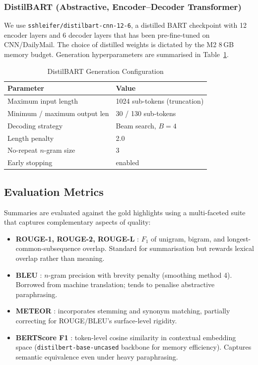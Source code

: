 \subsubsection{DistilBART (Abstractive, Encoder–Decoder Transformer)}

We use \texttt{sshleifer/distilbart-cnn-12-6}, a distilled BART
\cite{lewis2020bart} checkpoint with 12 encoder layers and 6 decoder
layers that has been pre-fine-tuned on CNN/DailyMail. The choice of
distilled weights is dictated by the M2 8\,GB memory budget. Generation
hyperparameters are summarised in Table~\ref{tab:bart_gen}.

\begin{table}[h]
\centering
\caption{DistilBART Generation Configuration}
\label{tab:bart_gen}
\begin{tabular}{ll}
\toprule
Parameter & Value \\
\midrule
Maximum input length        & 1024 sub-tokens (truncation) \\
Minimum / maximum output len & 30 / 130 sub-tokens \\
Decoding strategy           & Beam search, $B = 4$ \\
Length penalty              & 2.0 \\
No-repeat $n$-gram size     & 3 \\
Early stopping              & enabled \\
\bottomrule
\end{tabular}
\end{table}

\subsection{Evaluation Metrics}

Summaries are evaluated against the gold highlights using a multi-faceted
suite that captures complementary aspects of quality:

\begin{itemize}
  \item \textbf{ROUGE-1, ROUGE-2, ROUGE-L} \cite{lin2004rouge}: $F_1$ of
        unigram, bigram, and longest-common-subsequence overlap.
        Standard for summarisation but rewards lexical overlap rather
        than meaning.
  \item \textbf{BLEU} \cite{papineni2002bleu}: $n$-gram precision with
        brevity penalty (smoothing method 4). Borrowed from machine
        translation; tends to penalise abstractive paraphrasing.
  \item \textbf{METEOR} \cite{banerjee2005meteor}: incorporates stemming
        and synonym matching, partially correcting for ROUGE/BLEU's
        surface-level rigidity.
  \item \textbf{BERTScore F1} \cite{zhang2020bertscore}: token-level
        cosine similarity in contextual embedding space
        (\texttt{distilbert-base-uncased} backbone for memory
        efficiency). Captures semantic equivalence even under heavy
        paraphrasing.
\end{itemize}

